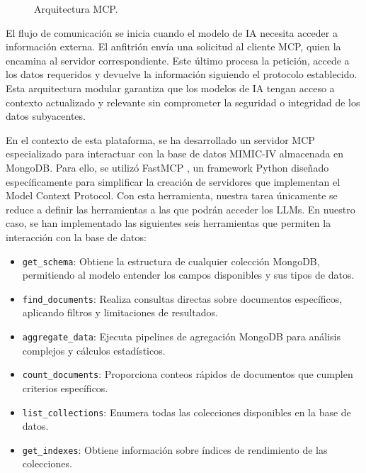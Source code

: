 \begin{figure}[H]
  \centering
  \caption{Arquitectura MCP.}
  \label{fig:mcp2}
\end{figure}

El flujo de comunicación se inicia cuando el modelo de IA necesita acceder a información externa. El anfitrión envía una solicitud al cliente MCP, quien la encamina al servidor correspondiente. Este último procesa la petición, accede a los datos requeridos y devuelve la información siguiendo el protocolo establecido. Esta arquitectura modular garantiza que los modelos de IA tengan acceso a contexto actualizado y relevante sin comprometer la seguridad o integridad de los datos subyacentes.





En el contexto de esta plataforma, se ha desarrollado un servidor MCP especializado para interactuar con la base de datos MIMIC-IV almacenada en MongoDB. Para ello, se utilizó FastMCP \cite{fastmcp}, un framework Python diseñado específicamente para simplificar la creación de servidores que implementan el Model Context Protocol. Con esta herramienta, nuestra tarea únicamente se reduce a definir las herramientas a las que podrán acceder los LLMs. En nuestro caso, se han implementado las siguientes seis herramientas que permiten la interacción con la base de datos:

\begin{itemize}
\item \texttt{get\_schema}: Obtiene la estructura de cualquier colección MongoDB, permitiendo al modelo entender los campos disponibles y sus tipos de datos.
\item \texttt{find\_documents}: Realiza consultas directas sobre documentos específicos, aplicando filtros y limitaciones de resultados.
\item \texttt{aggregate\_data}: Ejecuta pipelines de agregación MongoDB para análisis complejos y cálculos estadísticos.
\item \texttt{count\_documents}: Proporciona conteos rápidos de documentos que cumplen criterios específicos.
\item \texttt{list\_collections}: Enumera todas las colecciones disponibles en la base de datos.
\item \texttt{get\_indexes}: Obtiene información sobre índices de rendimiento de las colecciones.
\end{itemize}


